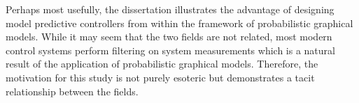 Perhaps most usefully, the dissertation illustrates the advantage of designing model predictive controllers from within the framework of probabilistic graphical models. While it may seem that the two fields are not related, most modern control systems perform filtering on system measurements which is a natural result of the application of probabilistic graphical models. Therefore, the motivation for this study is not purely esoteric but demonstrates a tacit relationship between the fields.   